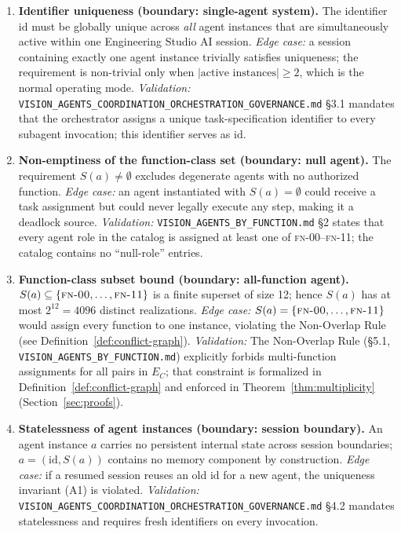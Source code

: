 \documentclass[12pt]{article}
\theoremstyle{definition}
\newcommand{\code}[1]{\texttt{#1}}
\newcommand{\FN}[1]{\textsc{fn-#1}}
\newcommand{\VisionGov}{\code{VISION\_AGENTS\_\allowbreak COORDINATION\_\allowbreak ORCHESTRATION\_\allowbreak GOVERNANCE.md}}
\newcommand{\VisionFunc}{\code{VISION\_AGENTS\_\allowbreak BY\_FUNCTION.md}}
\begin{document}
\begin{enumerate}[label=\textbf{A\arabic*.}, leftmargin=*, widest=A9]

  \item \textbf{Identifier uniqueness (boundary: single-agent system).}
        The identifier $\mathrm{id}$ must be globally unique across
        \emph{all} agent instances that are simultaneously active within
        one Engineering Studio AI session.
        \emph{Edge case:} a session containing exactly one agent instance
        trivially satisfies uniqueness; the requirement is non-trivial
        only when $\lvert\text{active instances}\rvert \geq 2$, which is
        the normal operating mode.
        \emph{Validation:} \VisionGov{} \S3.1 mandates that the
        orchestrator assigns a unique task-specification identifier to
        every subagent invocation; this identifier serves as $\mathrm{id}$.

  \item \textbf{Non-emptiness of the function-class set (boundary: null
        agent).}
        The requirement $S(a) \neq \emptyset$ excludes degenerate agents
        with no authorized function.
        \emph{Edge case:} an agent instantiated with $S(a) = \emptyset$
        could receive a task assignment but could never legally execute
        any step, making it a deadlock source.
        \emph{Validation:} \VisionFunc{} \S2 states that every agent role
        in the catalog is assigned at least one of \FN{00}--\FN{11};
        the catalog contains no ``null-role'' entries.

  \item \textbf{Function-class subset bound (boundary: all-function
        agent).}
        $S(a) \subseteq \{\FN{00},\ldots,\FN{11}\}$ is a finite
        superset of size 12; hence $S(a)$ has at most $2^{12} = 4096$
        distinct realizations.
        \emph{Edge case:} $S(a) = \{\FN{00},\ldots,\FN{11}\}$ would
        assign every function to one instance, violating the Non-Overlap
        Rule (see Definition~\ref{def:conflict-graph}).
        \emph{Validation:} The Non-Overlap Rule (\S5.1, \VisionFunc{})
        explicitly forbids multi-function assignments for all pairs in
        $E_C$; that constraint is formalized in
        Definition~\ref{def:conflict-graph} and enforced in
        Theorem~\ref{thm:multiplicity} (Section~\ref{sec:proofs}).

  \item \textbf{Statelessness of agent instances (boundary: session
        boundary).}
        An agent instance $a$ carries no persistent internal state
        across session boundaries; $a = (\mathrm{id}, S(a))$ contains
        no memory component by construction.
        \emph{Edge case:} if a resumed session reuses an old $\mathrm{id}$
        for a new agent, the uniqueness invariant (A1) is violated.
        \emph{Validation:} \VisionGov{} \S4.2 mandates statelessness and
        requires fresh identifiers on every invocation.


\end{enumerate}
\end{document}
